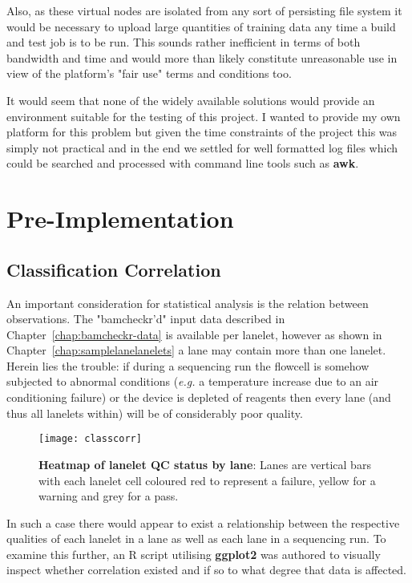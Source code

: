 Also, as these virtual nodes are isolated from any sort of persisting file
system it would be necessary to upload large quantities of training data any
time a build and test job is to be run. This sounds rather inefficient in terms
of both bandwidth and time and would more than likely constitute unreasonable
use in view of the platform's "fair use" terms and conditions too.

It would seem that none of the widely available solutions would provide an
environment suitable for the testing of this project. I wanted to provide my
own platform for this problem but given the time constraints of the project this
was simply not practical and in the end we settled for well formatted log files
which could be searched and processed with command line tools such as
\textbf{awk}.


\chapter{Pre-Implementation}
\section{Classification Correlation}

An important consideration for statistical analysis is the relation between
observations. The "bamcheckr'd" input data described in
Chapter~\ref{chap:bamcheckr-data} is available per lanelet, however as shown in
Chapter~\ref{chap:samplelanelanelets} a lane may contain more than one lanelet.
Herein lies the trouble: if during a sequencing run the flowcell is somehow
subjected to abnormal conditions (\textit{e.g.} a temperature increase due to an air
conditioning failure) or the device is depleted of reagents then every lane (and
thus all lanelets within) will be of considerably poor quality.

\begin{figure}[htbp!]
    \centering
    \texttt{[image: classcorr]}
    \caption[ClassCorr]{\textbf{Heatmap of lanelet QC status by lane}: Lanes are
    vertical bars with each lanelet cell coloured red to represent a failure,
yellow for a warning and grey for a pass.}
    \label{fig:classcorr}
\end{figure}

In such a case there would appear to exist a relationship between the respective
qualities of each lanelet in a lane as well as each lane in a sequencing run. To
examine this further, an R script utilising \textbf{ggplot2} was authored to
visually inspect whether correlation existed and if so to what degree that data
is affected.

